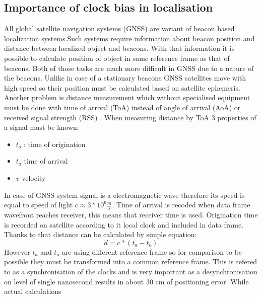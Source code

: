 \documentclass{kybernetika}
\begin{document}
\subsection{Importance of clock bias in localisation}
All global satellite navigation systems (GNSS) are variant of beacon based localization
systems\cite{Blewitt1997}.Such systems require information about beacon position
and distance between localized object and beacons.
With that information it is possible to calculate position of object in same reference
frame as that of beacons.
Both of those tasks are much more difficult in GNSS due to a nature of the beacons.
Unlike in case of a stationary beacons GNSS satellites move with high speed so
their position must be calculated based on satellite ephemeris\cite{Vallado2008}.
Another problem is distance measurement which without specialised equipment must be
done with time of arrival (ToA) instead of angle of arrival (AoA) or
received signal strength (RSS) \cite{Doberstein2012}.
When measuring distance by ToA  3 properties of a signal must be known:
\begin{itemize}
\item $t_o$ : time of origination
\item $t_a$ time of arrival
\item $v$ velocity
\end{itemize}
In case of GNSS system signal is a electromagnetic wave therefore its speed is equal
to speed of light $c\approx 3*10^{9} \frac{m}{s}$. Time of arrival is recoded when
data frame wavefront reaches receiver, this means that receiver time is used.
Origination time is recorded on satellite according to it local clock and
included in data frame. Thanks to that distance can be calculated by simple
equation:
\begin{equation}
  d=c*(t_a-t_o)
\end{equation}
However $t_a$ and $t_o$ are using different reference frame so for comparison
to be possible they must be transformed into a common reference frame.
This is refered to as a synchronisation of the clocks and is very important as
a desynchronisation on level of single nanosecond results in about 30 cm of
positioning error\cite{Enge2011}.
While actual calculations 

\end{document}
